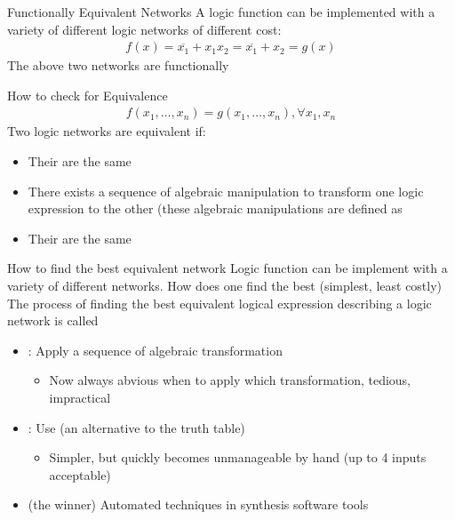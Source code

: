 \begin{parag}{Functionally Equivalent Networks}
    A logic function can be implemented with a variety of different logic networks of different cost:
    \begin{align*}
        f(x) = \overline{x_1} + x_1x_2 = \overline{x_1} + x_2 = g(x) 
    \end{align*}
    The above two networks are functionally 

    

\end{parag}
\begin{parag}{How to check for Equivalence}
    \begin{align*}
        f(x_1, \dots, x_n) = g(x_1, \dots, x_n), \forall x_1, x_n
    \end{align*}
    Two logic networks are equivalent if:
    \begin{itemize}
        \item Their  are the same
        \item There exists a sequence of algebraic manipulation to transform one logic expression to the other (these algebraic manipulations are defined as 
        \item Their  are the same
    \end{itemize}
    
\end{parag}
\begin{parag}{How to find the best equivalent network}
    Logic function can be implement with a variety of different networks. How does one find the best (simplest, least costly)
    \\
    The process of finding the best equivalent logical expression describing a logic network is called 
    \begin{itemize}
        \item {}: Apply a sequence of algebraic transformation
            \begin{itemize}
                \item Now always abvious when to apply which transformation, tedious, impractical
            \end{itemize}
        \item {}: Use  (an alternative to the truth table)
            \begin{itemize}
                \item Simpler, but quickly becomes unmanageable by hand (up to 4 inputs acceptable)
            \end{itemize}
        \item {} (the winner) Automated techniques in synthesis software tools
    \end{itemize}
\end{parag}
